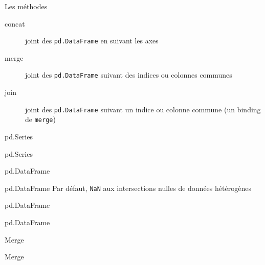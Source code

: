 
\begin{frame}{Les méthodes}
  \begin{description}
    \item[concat] joint des \texttt{pd.DataFrame} en suivant les axes
    \item[merge]  joint des \texttt{pd.DataFrame} suivant des indices ou colonnes communes
    \item[join]   joint des \texttt{pd.DataFrame} suivant un indice ou colonne commune (un binding de \texttt{merge})
  \end{description}
\end{frame}

\begin{frame}{pd.Series}
\end{frame}

\begin{frame}{pd.Series}
\end{frame}

\begin{frame}{pd.DataFrame}
\end{frame}

\begin{frame}{pd.DataFrame}
  Par défaut, \texttt{NaN} aux intersections nulles de données hétérogènes\\
\end{frame}

\begin{frame}{pd.DataFrame}
\end{frame}

\begin{frame}{pd.DataFrame}
\end{frame}


\begin{frame}{Merge}
\end{frame}

\begin{frame}{Merge}
\end{frame}

